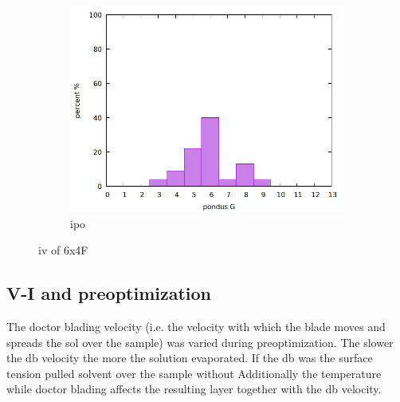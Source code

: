 \begin{figure}
\begin{subfigure}{.3\textwidth}
    \end{subfigure}
    \begin{subfigure}{.3\textwidth}
        \includegraphics[width=\textwidth]{Pics/iv/iv-192-ipo.png}
        \caption{ipo} \label{fig:ipo}
    \end{subfigure}
    \caption{iv of 6x4F} \label{fig:iv}
\end{figure}

\subsection{V-I and preoptimization}
The doctor blading velocity (i.e. the velocity with which the blade moves and spreads the sol over the sample) 
was varied during preoptimization. 
The slower the \gls{db} velocity the more  the solution evaporated. 
If the \gls{db} was  the surface tension pulled solvent over the sample without 
Additionally the temperature while doctor blading affects the resulting layer together with the \gls{db} velocity. 


